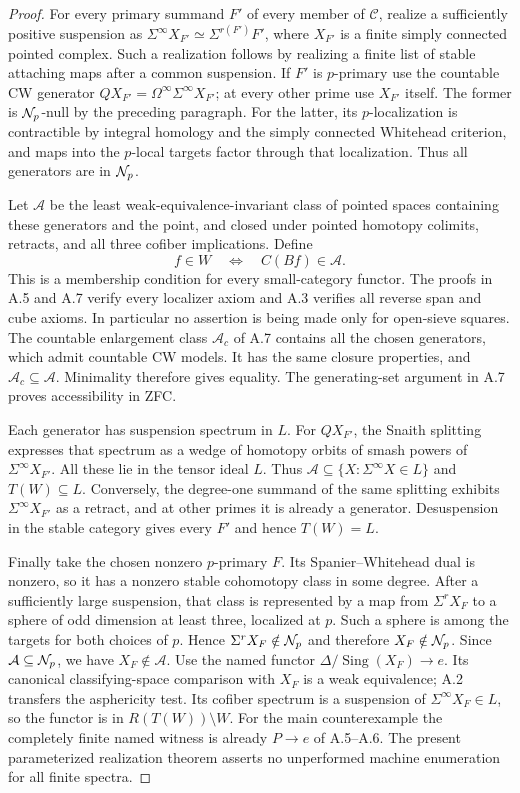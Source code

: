 \begin{proof}
For every primary summand $F'$ of every member of $\mathcal C$, realize a sufficiently positive suspension as
$\Sigma^\infty X_{F'}\simeq\Sigma^{r(F')}F'$, where $X_{F'}$ is a finite simply connected pointed complex. Such a realization follows by realizing a finite list of stable attaching maps after a common suspension. If $F'$ is $p$-primary use the countable CW generator $QX_{F'}=\Omega^\infty\Sigma^\infty X_{F'}$; at every other prime use $X_{F'}$ itself. The former is $\mathcal N_p$-null by the preceding paragraph. For the latter, its $p$-localization is contractible by integral homology and the simply connected Whitehead criterion, and maps into the $p$-local targets factor through that localization. Thus all generators are in $\mathcal N_p$.

Let $\mathcal A$ be the least weak-equivalence-invariant class of pointed spaces containing these generators and the point, and closed under pointed homotopy colimits, retracts, and all three cofiber implications. Define
\[
                     f\in W\quad\Longleftrightarrow\quad C(Bf)\in\mathcal A.
\]
This is a membership condition for every small-category functor. The proofs in A.5 and A.7 verify every localizer axiom and A.3 verifies all reverse span and cube axioms. In particular no assertion is being made only for open-sieve squares. The countable enlargement class $\mathcal A_c$ of A.7 contains all the chosen generators, which admit countable CW models. It has the same closure properties, and $\mathcal A_c\subseteq\mathcal A$. Minimality therefore gives equality. The generating-set argument in A.7 proves accessibility in ZFC.

Each generator has suspension spectrum in $L$. For $QX_{F'}$, the Snaith splitting expresses that spectrum as a wedge of homotopy orbits of smash powers of $\Sigma^\infty X_{F'}$. All these lie in the tensor ideal $L$. Thus $\mathcal A\subseteq\{X:\Sigma^\infty X\in L\}$ and $T(W)\subseteq L$. Conversely, the degree-one summand of the same splitting exhibits $\Sigma^\infty X_{F'}$ as a retract, and at other primes it is already a generator. Desuspension in the stable category gives every $F'$ and hence $T(W)=L$.

Finally take the chosen nonzero $p$-primary $F$. Its Spanier--Whitehead dual is nonzero, so it has a nonzero stable cohomotopy class in some degree. After a sufficiently large suspension, that class is represented by a map from $\Sigma^rX_F$ to a sphere of odd dimension at least three, localized at $p$. Such a sphere is among the targets for both choices of $p$. Hence $\Sigma^rX_F\notin\mathcal N_p$ and therefore $X_F\notin\mathcal N_p$. Since $\mathcal A\subseteq\mathcal N_p$, we have $X_F\notin\mathcal A$.
Use the named functor $\Delta/\operatorname{Sing}(X_F)\to e$. Its canonical classifying-space comparison with $X_F$ is a weak equivalence; A.2 transfers the asphericity test. Its cofiber spectrum is a suspension of $\Sigma^\infty X_F\in L$, so the functor is in $R(T(W))\setminus W$. For the main counterexample the completely finite named witness is already $P\to e$ of A.5--A.6. The present parameterized realization theorem asserts no unperformed machine enumeration for all finite spectra.


\end{proof}
